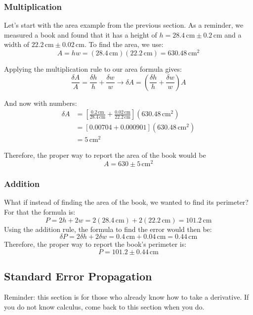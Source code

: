 \documentclass[twoside,11pt,ShortChapTitles]{BYUTextbook}
\begin{document}
\subsubsection{Multiplication}
Let's start with the area example from the previous section.  As a reminder, we measured a  book and found that it has a height of $h=28.4\,\text{cm} \pm0.2\,\text{cm} $ and a width of $22.2\,\text{cm} \pm0.02\,\text{cm}$.  To find the area, we use:
\[A = hw= (28.4\,\text{cm})(22.2\,\text{cm}) = 630.48\,\text{cm}^2\]

Applying the multiplication rule to our area formula gives:
\[\frac{\delta A}{A} = \frac{\delta h}{h}+\frac{\delta w}{w} \rightarrow \delta A = \left(\frac{\delta h}{h}+\frac{\delta w}{w}\right)A\]

And now with numbers:
\begin{align*}
\delta A &=\left[ \frac{0.2\,\text{cm}}{28.4\,\text{cm}}+\frac{0.02\,\text{cm}}{22.2\,\text{cm}} \right]\left(630.48\,\text{cm}^2\right)\\
&=\left[0.00704+0.000901\right]\left(630.48\,\text{cm}^2\right) \\
&=5\, \text{cm}^2
\end{align*}

Therefore, the proper way to report the area of the book would be
\[ A = 630 \pm 5\,\text{cm}^2\]

\subsubsection{Addition}
What if instead of finding the area of the book, we wanted to find its perimeter?  For that the formula is:
\[ P = 2h+2w =2\left(28.4\,\text{cm}\right)+2\left(22.2\,\text{cm}\right)=101.2\,\text{cm}\]
Using the addition rule, the formula to find the error would then be:
\[\delta P = 2\delta h + 2\delta w = 0.4 \,\text{cm}+0.04\,\text{cm}=0.44\,\text{cm}\]
Therefore, the proper way to report the book's perimeter is:
\[P = 101.2\pm 0.44 \,\text{cm}\]

\subsection{Standard Error Propagation}
Reminder: this section is for those who already know how to take a derivative.  If you do not know calculus, come back to this section when you do.
\end{document}
